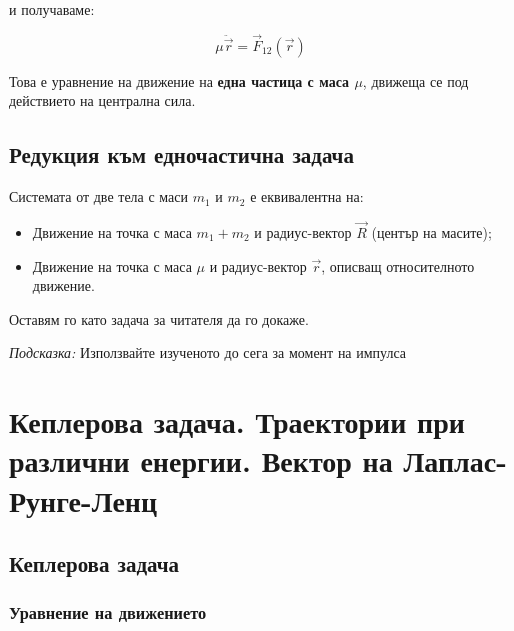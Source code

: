 \documentclass{report}
\begin{document}
и получаваме:

\[
\mu \ddot{\vec{r}} = \vec{F}_{12}(\vec{r})
\]

Това е уравнение на движение на \textbf{една частица с маса $\mu$}, движеща се под действието на централна сила.
\subsection{Редукция към едночастична задача}

Системата от две тела с маси $m_1$ и $m_2$ е еквивалентна на:

\begin{itemize}
  \item Движение на точка с маса $m_1 + m_2$ и радиус-вектор $\vec{R}$ (център на масите);
  \item Движение на точка с маса $\mu$ и радиус-вектор $\vec{r}$, описващ относителното движение.
\end{itemize}

Оставям го като задача за читателя да го докаже. 
\newline

\textit{Подсказка:} Използвайте изученото до сега за момент на импулса
\newpage

\section{Кеплерова задача. Траектории при различни енергии. Вектор на Лаплас-Рунге-Ленц}
\subsection{Кеплерова задача}

\subsubsection{Уравнение на движението}
\end{document}
